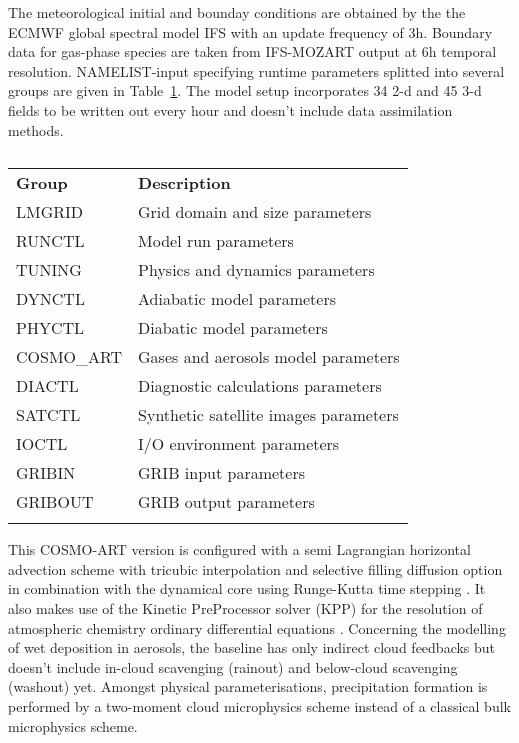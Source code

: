 The meteorological initial and  bounday conditions are obtained by the
the ECMWF  global spectral model IFS  with an update  frequency of 3h.
Boundary data  for gas-phase species are taken  from IFS-MOZART output
at   6h  temporal   resolution.   NAMELIST-input   specifying  runtime
parameters    splitted   into    several   groups    are    given   in
Table~\ref{tab:1}.   The model setup  incorporates 34  2-d and  45 3-d
fields  to  be  written  out  every  hour  and  doesn't  include  data
assimilation methods.

\begin{table}[htbf]
  \begin{center}
    \caption{}
    \label{tab:1}
    \begin{tabular}{ll}
      \hline\noalign{\smallskip} 
      \textbf{Group} & \textbf{Description} \\
      \noalign{\smallskip}\hline\noalign{\smallskip}
      LMGRID & Grid domain and size parameters \\
      RUNCTL & Model run parameters \\
      TUNING & Physics and dynamics parameters \\
      DYNCTL & Adiabatic model parameters \\
      PHYCTL & Diabatic model parameters \\
      COSMO\_ART & Gases and aerosols model parameters \\
      DIACTL & Diagnostic calculations parameters \\
      SATCTL & Synthetic satellite images parameters \\
      IOCTL & I/O environment parameters \\
      GRIBIN & GRIB input parameters \\
      GRIBOUT & GRIB output parameters \\
     \noalign{\smallskip}\hline
    \end{tabular}
  \end{center}
\end{table}

This COSMO-ART version is configured with a semi Lagrangian horizontal
advection  scheme with  tricubic interpolation  and  selective filling
diffusion  option  in  combination   with  the  dynamical  core  using
Runge-Kutta time stepping \citep{}.  It  also makes use of the Kinetic
PreProcessor solver (KPP) for  the resolution of atmospheric chemistry
ordinary  differential equations \citep{Damian-2002}.   Concerning the
modelling  of  wet  deposition  in  aerosols, the  baseline  has  only
indirect  cloud  feedbacks  but  doesn't include  in-cloud  scavenging
(rainout) and below-cloud  scavenging (washout) yet.  Amongst physical
parameterisations,   precipitation  formation   is   performed  by   a
two-moment  cloud  microphysics scheme  instead  of  a classical  bulk
microphysics scheme.
